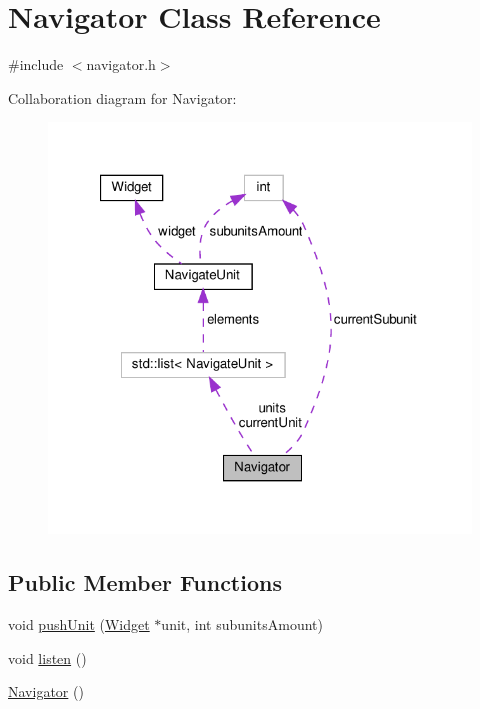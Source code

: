 \hypertarget{class_navigator}{}\section{Navigator Class Reference}
\label{class_navigator}


{\ttfamily \#include $<$navigator.\+h$>$}



Collaboration diagram for Navigator\+:
\nopagebreak
\begin{figure}[H]
\begin{center}
\leavevmode
\includegraphics[width=321pt]{class_navigator__coll__graph}
\end{center}
\end{figure}
\subsection*{Public Member Functions}
\begin{DoxyCompactItemize}
\item 
void \mbox{\hyperlink{class_navigator_a47967fc9bdfd276c98f8ed1c44d5dc46}{push\+Unit}} (\mbox{\hyperlink{class_widget}{Widget}} $\ast$unit, int subunits\+Amount)
\item 
void \mbox{\hyperlink{class_navigator_ab9b30029b9ef06cca27ebc5b2549121c}{listen}} ()
\item 
\mbox{\hyperlink{class_navigator_a59230ab4698882f754d5ce275a1a4030}{Navigator}} ()
\end{DoxyCompactItemize}

